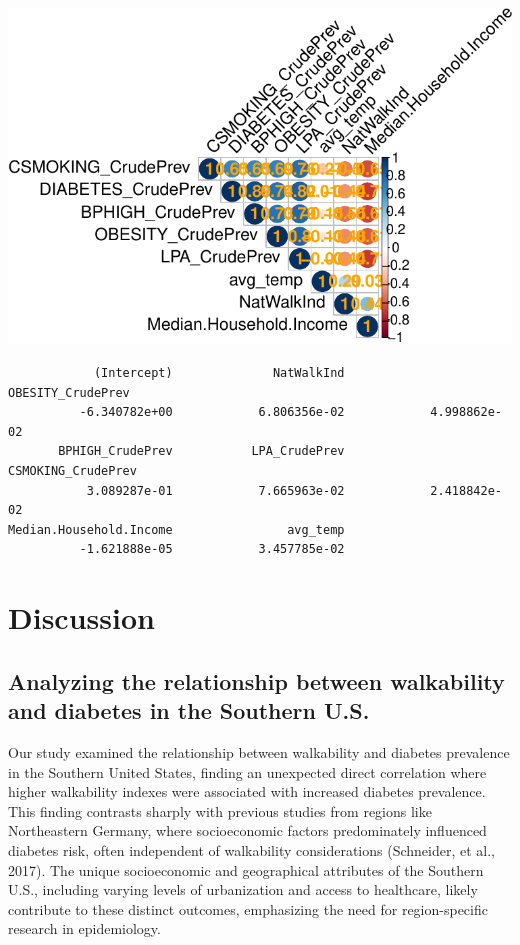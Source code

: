 \documentclass[
]{article}
\begin{document}
\includegraphics{report_files/figure-pdf/unnamed-chunk-6-1.pdf}

\begin{verbatim}
            (Intercept)              NatWalkInd       OBESITY_CrudePrev 
          -6.340782e+00            6.806356e-02            4.998862e-02 
       BPHIGH_CrudePrev           LPA_CrudePrev      CSMOKING_CrudePrev 
           3.089287e-01            7.665963e-02            2.418842e-02 
Median.Household.Income                avg_temp 
          -1.621888e-05            3.457785e-02 
\end{verbatim}

\section{Discussion}\label{discussion}

\subsection{Analyzing the relationship between walkability and diabetes
in the Southern
U.S.}\label{analyzing-the-relationship-between-walkability-and-diabetes-in-the-southern-u.s.}

Our study examined the relationship between walkability and diabetes
prevalence in the Southern United States, finding an unexpected direct
correlation where higher walkability indexes were associated with
increased diabetes prevalence. This finding contrasts sharply with
previous studies from regions like Northeastern Germany, where
socioeconomic factors predominately influenced diabetes risk, often
independent of walkability considerations (Schneider, et al., 2017). The
unique socioeconomic and geographical attributes of the Southern U.S.,
including varying levels of urbanization and access to healthcare,
likely contribute to these distinct outcomes, emphasizing the need for
region-specific research in epidemiology.
\end{document}
